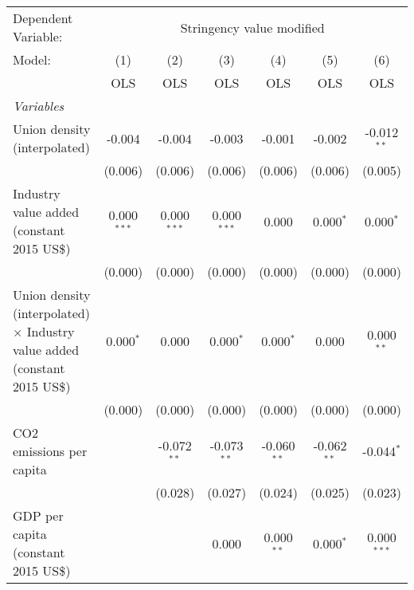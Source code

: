 
\begingroup
\centering
\begin{tabular}{lcccccc}
   \toprule
   Dependent Variable: & \multicolumn{6}{c}{Stringency value modified}\\
   Model:                                                                            & (1)           & (2)           & (3)           & (4)           & (5)           & (6)\\  
                                                                                     &  OLS          & OLS           & OLS           & OLS           & OLS           & OLS\\  
   \midrule
   \emph{Variables}\\
   Union density (interpolated)                                                      & -0.004        & -0.004        & -0.003        & -0.001        & -0.002        & -0.012$^{**}$\\   
                                                                                     & (0.006)       & (0.006)       & (0.006)       & (0.006)       & (0.006)       & (0.005)\\   
   Industry value added (constant 2015 US\$)                                         & 0.000$^{***}$ & 0.000$^{***}$ & 0.000$^{***}$ & 0.000         & 0.000$^{*}$   & 0.000$^{*}$\\   
                                                                                     & (0.000)       & (0.000)       & (0.000)       & (0.000)       & (0.000)       & (0.000)\\   
   Union density (interpolated) $\times$ Industry value added (constant 2015 US\$)   & 0.000$^{*}$   & 0.000         & 0.000$^{*}$   & 0.000$^{*}$   & 0.000         & 0.000$^{**}$\\   
                                                                                     & (0.000)       & (0.000)       & (0.000)       & (0.000)       & (0.000)       & (0.000)\\   
   CO2 emissions per capita                                                          &               & -0.072$^{**}$ & -0.073$^{**}$ & -0.060$^{**}$ & -0.062$^{**}$ & -0.044$^{*}$\\   
                                                                                     &               & (0.028)       & (0.027)       & (0.024)       & (0.025)       & (0.023)\\   
   GDP per capita (constant 2015 US\$)                                               &               &               & 0.000         & 0.000$^{**}$  & 0.000$^{*}$   & 0.000$^{***}$\\   

\end{tabular}

